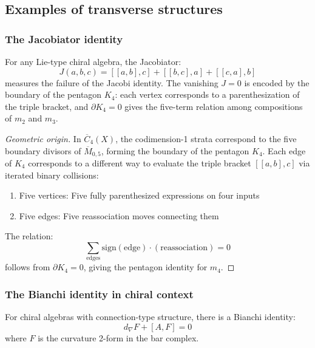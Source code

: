 
\subsection{Examples of transverse structures}

\subsubsection{The Jacobiator identity}

\begin{theorem}\label{thm:jacobiator-lie-type}
For any Lie-type chiral algebra, the Jacobiator:
\[J(a,b,c) = [[a,b],c] + [[b,c],a] + [[c,a],b]\]
measures the failure of the Jacobi identity. The vanishing $J = 0$ is encoded by the boundary of the pentagon $K_4$: each vertex corresponds to a parenthesization of the triple bracket, and $\partial K_4 = 0$ gives the five-term relation among compositions of $m_2$ and $m_3$.
\end{theorem}

\begin{proof}[Geometric origin]
In $\overline{C}_4(X)$, the codimension-1 strata correspond to the five boundary divisors of $\overline{M}_{0,5}$, forming the boundary of the pentagon $K_4$. Each edge of $K_4$ corresponds to a different way to evaluate the triple bracket $[[a,b],c]$ via iterated binary collisions:
\begin{enumerate}
\item Five vertices: Five fully parenthesized expressions on four inputs
\item Five edges: Five reassociation moves connecting them
\end{enumerate}

The relation:
\[\sum_{\text{edges}} \text{sign}(\text{edge}) \cdot (\text{reassociation}) = 0\]
follows from $\partial K_4 = 0$, giving the pentagon identity for $m_4$.
\end{proof}

\subsubsection{The Bianchi identity in chiral context}

\begin{theorem}\label{thm:chiral-bianchi}
For chiral algebras with connection-type structure, there is a Bianchi identity:
\[d_\nabla F + [A, F] = 0\]
where $F$ is the curvature 2-form in the bar complex.
\end{theorem}

